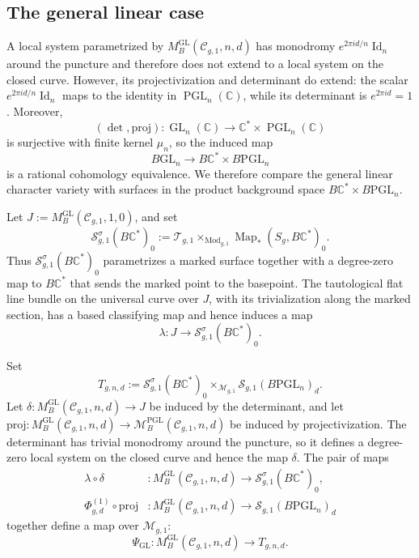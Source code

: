 \documentclass[11pt,reqno]{amsart}
\theoremstyle{plain} %
\theoremstyle{definition}
\newcommand{\CC}{\mathbb{C}}
\newcommand{\M}{\mathcal{M}}
\newcommand{\C}{\mathcal{C}}
\newcommand{\mc}{\mathcal}
\DeclareMathOperator{\Id}{Id}
\DeclareMathOperator{\GL}{GL}
\DeclareMathOperator{\PGL}{PGL}
\newcommand{\BGL}{B\mathrm{GL}}
\newcommand{\BPGL}{B\mathrm{PGL}}
\DeclareMathOperator{\Mod}{Mod}
\DeclareMathOperator{\Map}{Map}
\newcommand{\Sc}{\mathcal{S}}
\begin{document}
\subsection{The general linear case} \label{subsec: GL ring}

A local system parametrized by $M_B^{\GL}(\C_{g,1},n,d)$ has monodromy $e^{2\pi i d/n}\Id_n$ around the puncture and therefore does not extend to a local system on the closed curve. However, its projectivization and determinant do extend: the scalar $e^{2\pi i d/n}\Id_n$ maps to the identity in $\PGL_n(\CC)$, while its determinant is $e^{2\pi i d}=1$. Moreover, 
\[
(\det,\mathrm{proj})\colon \GL_n(\CC)\longrightarrow \CC^*\times\PGL_n(\CC)
\]
is surjective with finite kernel $\mu_n$, so the induced map
\[
\BGL_n\longrightarrow B\CC^*\times\BPGL_n
\]
is a rational cohomology equivalence. We therefore compare the general linear character variety with surfaces in the product background space $B\CC^*\times\BPGL_n$.

Let $J:=M_B^{\GL}(\C_{g,1},1,0)$, and set
\[
\Sc^\sigma_{g,1}(B\CC^*)_0
:=
\mc T_{g,1}\times_{\Mod_{g,1}}\Map_*(S_g,B\CC^*)_0.
\]
Thus $\Sc^\sigma_{g,1}(B\CC^*)_0$ parametrizes a marked surface together with a degree-zero map to $B\CC^*$ that sends the marked point to the basepoint. The tautological flat line bundle on the universal curve over $J$, with its trivialization along the marked section, has a based classifying map and hence induces a map
\[
\lambda\colon J\longrightarrow\Sc^\sigma_{g,1}(B\CC^*)_0.
\]

Set
\[
T_{g,n,d}:=
\Sc^\sigma_{g,1}(B\CC^*)_0
\times_{\M_{g,1}}
\Sc_{g,1}(\BPGL_n)_d.
\]
Let $\delta\colon M_B^{\GL}(\C_{g,1},n,d)\to J$ be induced by the determinant, and let $\mathrm{proj}\colon M_B^{\GL}(\C_{g,1},n,d)\to\M_B^{\PGL}(\C_{g,1},n,d)$ be induced by projectivization. The determinant has trivial monodromy around the puncture, so it defines a degree-zero local system on the closed curve and hence the map $\delta$. The pair of maps
\[
\begin{aligned}
\lambda\circ\delta&\colon M_B^{\GL}(\C_{g,1},n,d)\longrightarrow\Sc^\sigma_{g,1}(B\CC^*)_0,\\
\Phi^{(1)}_{g,d}\circ\mathrm{proj}&\colon M_B^{\GL}(\C_{g,1},n,d)\longrightarrow\Sc_{g,1}(\BPGL_n)_d
\end{aligned}
\]
together define a map over $\M_{g,1}$:
\[
\Psi_{\GL}\colon M_B^{\GL}(\C_{g,1},n,d)\longrightarrow T_{g,n,d}.
\]
\end{document}
